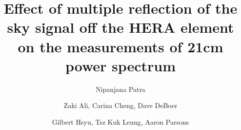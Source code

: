 \documentclass[12pt,preprint]{aastex}
\begin{document}
\title{Effect of multiple reflection of the sky signal off the HERA element on the measurements of 21cm power spectrum} 

\author{Nipanjana Patra }


\author{Zaki Ali, Carina Cheng, Dave DeBoer}
\author{Gilbert Hsyu, Tsz Kuk Leung, Aaron Parsons}


\begin{abstract}
\end{abstract}
\end{document}
